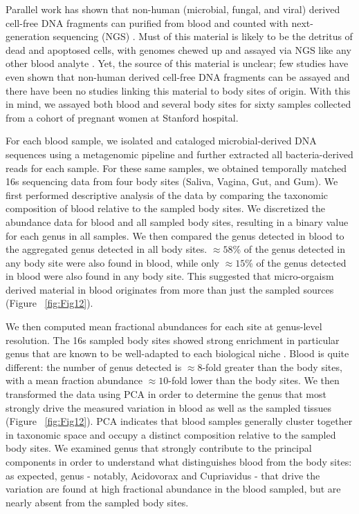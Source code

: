 Parallel work has shown that non-human (microbial, fungal, and viral) derived cell-free DNA fragments can purified from blood and counted with next-generation sequencing (NGS) \cite{DeVlaminck:2013hl}. Must of this material is likely to be the detritus of dead and apoptosed cells, with genomes chewed up and assayed via NGS like any other blood analyte \cite{Quake:2012iy}. Yet, the source of this material is unclear; few studies have even shown that non-human derived cell-free DNA fragments can be assayed and there have been no studies linking this material to body sites of origin. With this in mind, we assayed both blood and several body sites for sixty samples collected from a cohort of pregnant women at Stanford hospital. 

For each blood sample, we isolated and cataloged microbial-derived DNA sequences using a metagenomic pipeline and further extracted all bacteria-derived reads for each sample. For these same samples, we obtained temporally matched 16s sequencing data from four body sites (Saliva, Vagina, Gut, and Gum). We first performed descriptive analysis of the data by comparing the taxonomic composition of blood relative to the sampled body sites. We discretized the abundance data for blood and all sampled body sites, resulting in a binary value for each genus in all samples. We then compared the genus detected in blood to the aggregated genus detected in all body sites. $\approx 58$\% of the genus detected in any body site were also found in blood, while only $\approx 15$\% of the genus detected in blood were also found in any body site. This suggested that micro-orgaism derived material in blood originates from more than just the sampled sources (Figure ~\ref{fig:Fig12}).

We then computed mean fractional abundances for each site at genus-level resolution. The 16s sampled body sites showed strong enrichment in particular genus that are known to be well-adapted to each biological niche \cite{Consortium:2012bb}. Blood is quite different: the number of genus detected is $\approx 8$-fold greater than the body sites, with a mean fraction abundance $\approx 10$-fold lower than the body sites. We then transformed the data using PCA in order to determine the genus that most strongly drive the measured variation in blood as well as the sampled tissues (Figure ~\ref{fig:Fig12}). PCA indicates that blood samples generally cluster together in taxonomic space and occupy a distinct composition relative to the sampled body sites. We examined genus that strongly contribute to the principal components in order to understand what distinguishes blood from the body sites: as expected, genus - notably, Acidovorax and Cupriavidus - that drive the variation are found at high fractional abundance in the blood sampled, but are nearly absent from the sampled body sites. 

